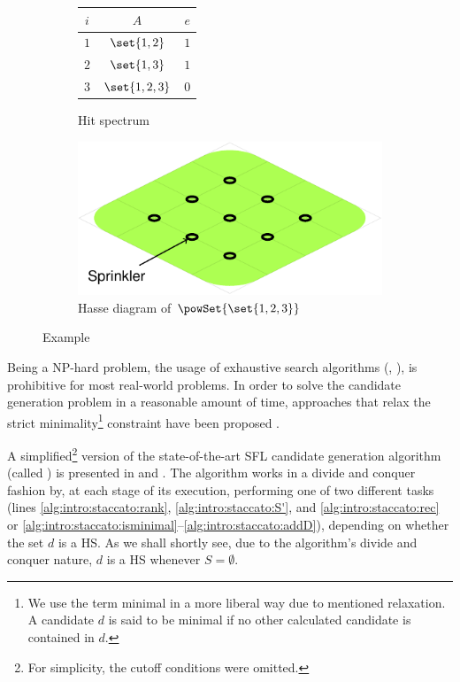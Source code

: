 \begin{figure}[ht]
  \begin{subfigure}{0.4\columnwidth}
    \begin{tabular}{c|c|c}
      $i$ & $A$           & $e$ \\\hline
      $1$ & $\set{1,2}$   & $1$ \\
      $2$ & $\set{1,3}$   & $1$ \\
      $3$ & $\set{1,2,3}$ & $0$ \\
    \end{tabular}
    \caption{Hit spectrum\label{fig:intro:spectrum-example}}
  \end{subfigure}
  \begin{subfigure}{0.45\columnwidth}
    \includegraphics[page=7]{figures/introduction/figures/main.pdf}
    \caption{Hasse diagram of $\powSet{\set{1,2,3}}$\label{fig:intro:hasse}}
  \end{subfigure}
  \caption{Example}
\end{figure}





Being a NP-hard problem, the usage of exhaustive search algorithms
(\eg, \citep{Reiter87,Wotawa01}), is prohibitive for most real-world
problems.
%
In order to solve the candidate generation problem in a reasonable
amount of time, approaches that relax the strict
minimality\footnote{We use the term minimal in a more liberal way due
  to mentioned relaxation. A candidate $d$ is said to be minimal if no
  other calculated candidate is contained in $d$.} constraint have
been proposed \citep{Abreu09b,Kleer92,Feldman08}.

A simplified\footnote{For simplicity, the cutoff conditions were
  omitted.} version of the state-of-the-art \ac{SFL} candidate
generation algorithm (called \staccato{}) \citep{Abreu09b} is
presented in  and
.
%
The algorithm works in a divide and conquer fashion by, at each stage
of its execution, performing one of two different tasks (lines
\ref{alg:intro:staccato:rank},
\ref{alg:intro:staccato:S'}, and
\ref{alg:intro:staccato:rec} or
\ref{alg:intro:staccato:isminimal}--\ref{alg:intro:staccato:addD}),
depending on whether the set $d$ is a \ac{HS}.
%
As we shall shortly see, due to the algorithm's divide and conquer
nature, $d$ is a \ac{HS} whenever $S = \emptyset$.

